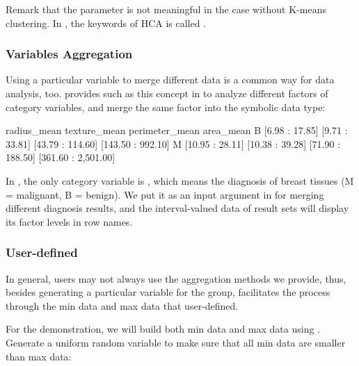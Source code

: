 \documentclass[article]{jss}
\begin{document}
Remark that the  parameter is not meaningful in the case without K-means clustering. In , the keywords of HCA is called .

\subsubsection{Variables Aggregation}

Using a particular variable to merge different data is a common way for data analysis, too.  provides such as this concept in  to analyze different factors of category variables, and merge the same factor into the symbolic data type:

\begin{Schunk}
\begin{Soutput}
      radius_mean    texture_mean   perimeter_mean           area_mean
B  [6.98 : 17.85]  [9.71 : 33.81] [43.79 : 114.60]   [143.50 : 992.10]
M [10.95 : 28.11] [10.38 : 39.28] [71.90 : 188.50] [361.60 : 2,501.00]
\end{Soutput}
\end{Schunk}

In , the only category variable is , which means the diagnosis of breast tissues (M = malignant, B = benign). We put it as an input argument in  for merging different diagnosis results, and the interval-valued data of result sets will display its factor levels in row names.


\subsubsection{User-defined}\label{sec:userDef}

In general, users may not always use the aggregation methods we provide, thus, besides generating a particular variable for the group,  facilitates the process through the min data and max data that user-defined.

For the demonstration, we will build both min data and max data using . Generate a uniform random variable to make sure that all min data are smaller than max data:
\end{document}
